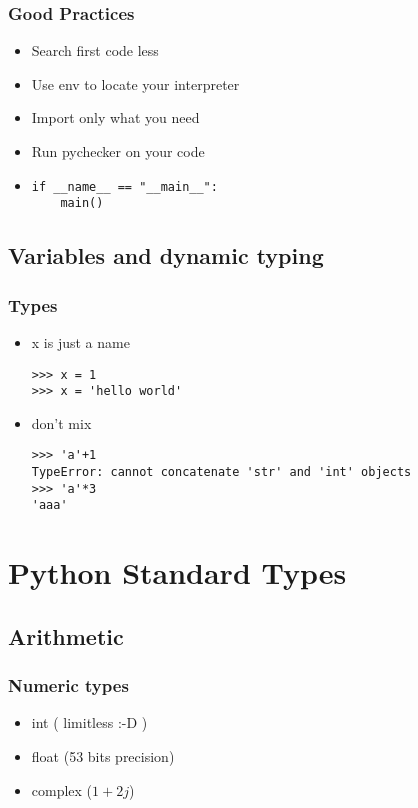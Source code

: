 \documentclass{beamer}
\begin{document}
\begin{frame}[fragile]
    \frametitle{Good Practices}

    \begin{itemize}
        \item<1-> Search first code less
        \item<2-> Use env to locate your interpreter
        \item<3-> Import only what you need
        \item<4-> Run pychecker on your code
        \item<5-> 
            \begin{verbatim} 
if __name__ == "__main__":
    main()
            \end{verbatim}
    \end{itemize}

\end{frame}

\subsection{Variables and dynamic typing}
\begin{frame}[fragile]
    \frametitle{Types}
    \begin{itemize}
        \item<1-> x is just a name
            \begin{verbatim}
>>> x = 1
>>> x = 'hello world'
            \end{verbatim}
        \item<2-> don't mix
            \begin{verbatim}
>>> 'a'+1
TypeError: cannot concatenate 'str' and 'int' objects
>>> 'a'*3
'aaa'
            \end{verbatim}
    \end{itemize}
\end{frame}

\section{Python Standard Types}
\subsection{Arithmetic}

\begin{frame}
    \frametitle{Numeric types}
    \begin{itemize}
        \item<1-> int ( limitless :-D )
        \item<2-> float (53 bits precision)
        \item<3-> complex ($1+2j$)
    \end{itemize}
\end{frame}
\end{document}
